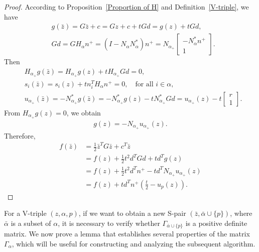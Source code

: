 \documentclass{article}
\begin{document}
	\begin{proof}
		According to Proposition~\ref{Proportion of H} and Definition~\ref{V-triple}, we have
		\begin{align*}
			& g(\bar{z}) = G\bar{z} + c = Gz + c + tGd = g(z) + tGd,\\
			& Gd = GH_{\alpha}n^{+} = (I - N_{\alpha}N_{\alpha}^{\ast})n^{+}
			= N_{\alpha_{+}}
			\begin{bmatrix}
				-N_{\alpha}^{\ast}n^{+}\\
				1
			\end{bmatrix}.
		\end{align*}
		Then
		\begin{align*}
			& H_{\alpha_{+}}g(\bar{z}) = H_{\alpha_{+}}g(z) + tH_{\alpha_{+}}Gd = 0,\\
			& s_{i}(\bar{z}) = s_{i}(z) + tn_{i}^{T}H_{\alpha}n^{+} = 0,
			\quad \text{for all } i \in \alpha,\\
			& u_{\alpha_{+}}(\bar{z}) = -N_{\alpha_{+}}^{\ast}g(\bar{z})
			= -N_{\alpha_{+}}^{\ast}g(z) - tN_{\alpha_{+}}^{\ast}Gd
			= u_{\alpha_{+}}(z) - t
			\begin{bmatrix}
				r\\
				1
			\end{bmatrix}.
		\end{align*}
		From $H_{\alpha_{+}}g(z) = 0$, we obtain
		\begin{align*}
			g(z) = -N_{\alpha_{+}}u_{\alpha_{+}}(z).
		\end{align*}
		Therefore,
		\begin{align*}
			f(\bar{z})
			&= \frac{1}{2}\bar{z}^{T}G\bar{z} + c^{T}\bar{z} \\
			&= f(z) + \frac{1}{2}t^{2}d^{T}Gd + td^{T}g(z) \\
			&= f(z) + \frac{1}{2}t^{2}d^{T}n^{+} - td^{T}N_{\alpha_{+}}u_{\alpha_{+}}(z) \\
			&= f(z) + td^{T}n^{+}\left(\frac{t}{2} - u_{p}(z)\right).
		\end{align*}
	\end{proof}
	
	For a V-triple $(z, \alpha, p)$, if we want to obtain a new S-pair
	$(\bar{z}, \bar{\alpha}\cup\{p\})$, where $\bar{\alpha}$ is a subset of $\alpha$,
	it is necessary to verify whether $\Gamma_{\bar{\alpha}\cup\{p\}}$
	is a positive definite matrix. We now prove a lemma that establishes several
	properties of the matrix $\Gamma_{\alpha}$, which will be useful for
	constructing and analyzing the subsequent algorithm.
\end{document}
